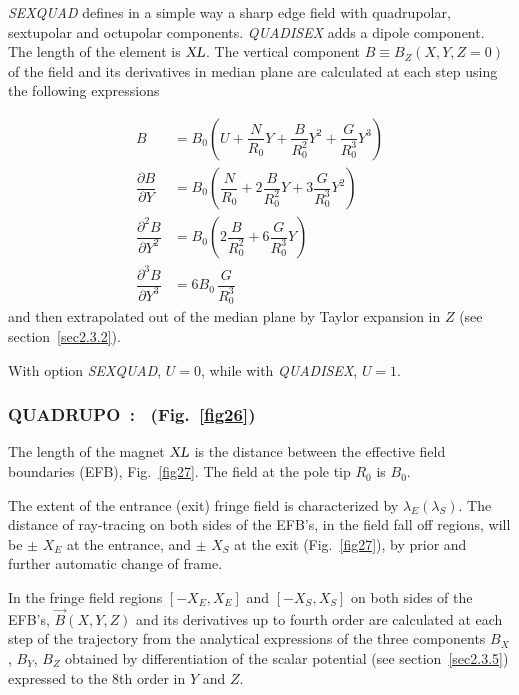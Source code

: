 \textsl{SEXQUAD}    defines in a simple way a sharp edge field with quadrupolar, 
sextupolar and octupolar components. \textsl{QUADISEX}  adds a dipole component. The length of 
the element is $ \textsl{XL} $.  The vertical component $ B \equiv B_Z(X,Y,Z=0) $ of the field and its derivatives in median plane are 
calculated at each step using the following expressions 

\begin{align*}
	B &   =     B_0
	           \left(U+ \dfrac{N }{ R_0}Y + 
	                \dfrac{B }{ R^2_0} Y^2+ \dfrac{G }{ R^3_0} Y^3 \right)  \\
	\dfrac{ \partial B }{ \partial Y} 
	   &   =   B_0 \left(
	             \dfrac{N }{ R_0} + 2 \dfrac{B }{ R^2_0} Y + 3\dfrac{G }{ R^3_0}Y^2 \right) \\  
	\dfrac{ \partial^ 2B }{ \partial Y^2} 
	  &  =     B_0 \left(2 \dfrac{B }{ R^2_0} + 6\dfrac{G }{ R^3_0} Y \right) \\
	\dfrac{ \partial^ 3B }{ \partial Y^3}  
	   & =     6B_0 \,  \dfrac{G }{ R^3_0}
\end{align*}  
    and then extrapolated out of the median plane by Taylor expansion in $ Z $ 
(see section~\ref{sec2.3.2}).
\medskip

\noindent With option \textsl{SEXQUAD}, $ U=0$,  while with \textsl{QUADISEX}, $U=1 $. 

\newpage

\subsubsection*{QUADRUPO~:  \QUADRUPOTitl\  (Fig.~\protect\ref{fig26}) } \label{QUADRUPO} 
\medskip

The length of the magnet $ \textsl{XL} $ is the distance between the
effective field boundaries (EFB), Fig.~\ref{fig27}. The field at the pole tip $ R_0 $ is $ B_0 $. 

\noindent The extent of the  entrance (exit) fringe field is characterized by 
$ \lambda_ E(\lambda_ S) $.  The distance of ray-tracing on both sides of the
EFB's, in the field fall off regions, will be $\pm$  $ X_E $ at 
the entrance, and $\pm$  $ X_S $ at the exit (Fig.~\ref{fig27}),  
by prior and further automatic change of frame. 

\noindent In the fringe field  regions $[ -X_E,X_E ]$  and 
$[ -X_S,X_S ]$ on both sides of the EFB's, $ \vec  B(X,Y,Z) $ and its derivatives up to
fourth order are calculated at each step of the trajectory from the analytical expressions 
of the three components $ B_X $, $ B_Y $, $ B_Z $ obtained by differentiation
of the scalar potential (see section~\ref{sec2.3.5}) expressed to the 8th order in $ Y $ 
and $ Z $. 

